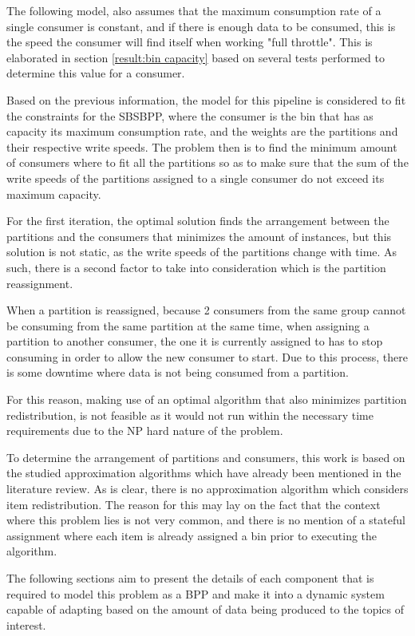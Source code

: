 The following model, also assumes that the maximum consumption rate of a single
consumer is constant, and if there is enough data to be consumed, this is the
speed the consumer will find itself when working "full throttle". This is
elaborated in section \ref{result:bin capacity} based on several tests performed
to determine this value for a consumer. 

Based on the previous information, the model for this pipeline is considered to
fit the constraints for the SBSBPP, where the consumer is the bin that has as
capacity its maximum consumption rate, and the weights are the partitions and
their respective write speeds. The problem then is to find the minimum amount of
consumers where to fit all the partitions so as to make sure that the sum of the
write speeds of the partitions assigned to a single consumer do not exceed its
maximum capacity. 

For the first iteration, the optimal solution finds the arrangement between the
partitions and the consumers that minimizes the amount of instances, but this
solution is not static, as the write speeds of the partitions change with time.
As such, there is a second factor to take into consideration which is the
partition reassignment. 

When a partition is reassigned, because 2 consumers from the same group cannot
be consuming from the same partition at the same time, when assigning a
partition to another consumer, the one it is currently assigned to has to stop
consuming in order to allow the new consumer to start. Due to this process,
there is some downtime where data is not being consumed from a partition.

For this reason, making use of an optimal algorithm that also minimizes
partition redistribution, is not feasible as it would not run within the
necessary time requirements due to the NP hard nature of the problem. 

To determine the arrangement of partitions and consumers, this work is based on
the studied approximation algorithms which have already been mentioned in the
literature review. As is clear, there is no approximation algorithm which
considers item redistribution. The reason for this may lay on the fact that the
context where this problem lies is not very common, and there is no mention of a
stateful assignment where each item is already assigned a bin prior to executing
the algorithm.

The following sections aim to present the details of each component that is
required to model this problem as a BPP and make it into a dynamic system
capable of adapting based on the amount of data being produced to the topics of
interest.

